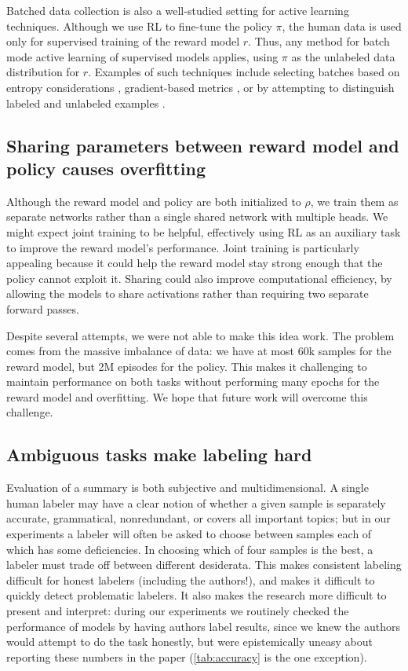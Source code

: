 Batched data collection is also a well-studied setting for active learning techniques.  Although we use RL to fine-tune the policy $\pi$, the human data is used only for supervised training of the reward model $r$.  Thus, any method for batch mode active learning of supervised models applies, using $\pi$ as the unlabeled data distribution for $r$.  Examples of such techniques include selecting batches based on entropy considerations \citep{guo2008discriminative}, gradient-based metrics \citep{huang2016active,ash2019deep}, or by attempting to distinguish labeled and unlabeled examples \citep{gissin2019discriminative}.

\subsection{Sharing parameters between reward model and policy causes overfitting \label{sec:sharing}}

Although the reward model and policy are both initialized to $\rho$, we train them as separate networks rather than a single shared network with multiple heads. We might expect joint training to be helpful, effectively using RL as an auxiliary task to improve the reward model's performance. Joint training is particularly appealing because it could help the reward model stay strong enough that the policy cannot exploit it. Sharing could also improve computational efficiency, by allowing the models to share activations rather than requiring two separate forward passes.

Despite several attempts, we were not able to make this idea work. The problem comes from the massive imbalance of data: we have at most 60k samples for the reward model, but 2M episodes for the policy. This makes it challenging to maintain performance on both tasks without performing many epochs for the reward model and overfitting. We hope that future work will overcome this challenge.

\subsection{Ambiguous tasks make labeling hard}

Evaluation of a summary is both subjective and multidimensional.  A single human labeler may have a clear notion of whether a given sample is separately accurate, grammatical, nonredundant, or covers all important topics; but in our experiments a labeler will often be asked to choose between samples each of which has some deficiencies. In choosing which of four samples is the best, a labeler must trade off between different desiderata. This makes consistent labeling difficult for honest labelers (including the authors!), and makes it difficult to quickly detect problematic labelers. It also makes the research more difficult to present and interpret: during our experiments we routinely checked the performance of models by having authors label results, since we knew the authors would attempt to do the task honestly, but were epistemically uneasy about reporting these numbers in the paper (\ref{tab:accuracy} is the one exception).

